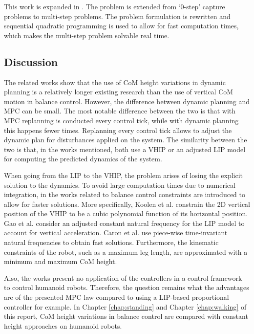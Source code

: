 This work is expanded in \cite{caron2018capturability}. The problem is extended from `0-step' capture problems to multi-step problems. The problem formulation is rewritten and sequential quadratic programming is used to allow for fast computation times, which makes the multi-step problem solvable real time.

\subsection{Discussion}
The related works show that the use of \ac{CoM} height variations in dynamic planning is a relatively longer existing research than the use of  vertical \ac{CoM} motion in balance control. However, the difference between dynamic planning and \ac{MPC} can be small. The most notable difference between the two is that with \ac{MPC} replanning is conducted every control tick, while with dynamic planning this happens fewer times. Replanning every control tick allows to adjust the dynamic plan for disturbances applied on the system. The similarity between the two is that, in the works mentioned, both use a \ac{VHIP} or an adjusted \ac{LIP} model for computing the predicted dynamics of the system.

When going from the \ac{LIP} to the \ac{VHIP}, the problem arises of losing the explicit solution to the dynamics. To avoid large computation times due to numerical integration, in the works related to balance control constraints are introduced to allow for faster solutions. More specifically, Koolen et al. constrain the \ac{2D} vertical position of the \ac{VHIP} to be a cubic polynomial function of its horizontal position. Gao et al. consider an adjusted constant natural frequency for the \ac{LIP} model to account for vertical acceleration. Caron et al. use piece-wise time-invariant natural frequencies to obtain fast solutions. Furthermore, the kinematic constraints of the robot, such as a maximum leg length, are approximated with a minimum and maximum \ac{CoM} height.

Also, the works present no application of the controllers in a control framework to control humanoid robots. Therefore, the question remains what the advantages are of the presented \ac{MPC} law compared to using a \ac{LIP}-based proportional controller for example. In Chapter \ref{chap:standing} and Chapter \ref{chap:walking} of this report, \ac{CoM} height variations in balance control are compared with constant height approaches on humanoid robots.

